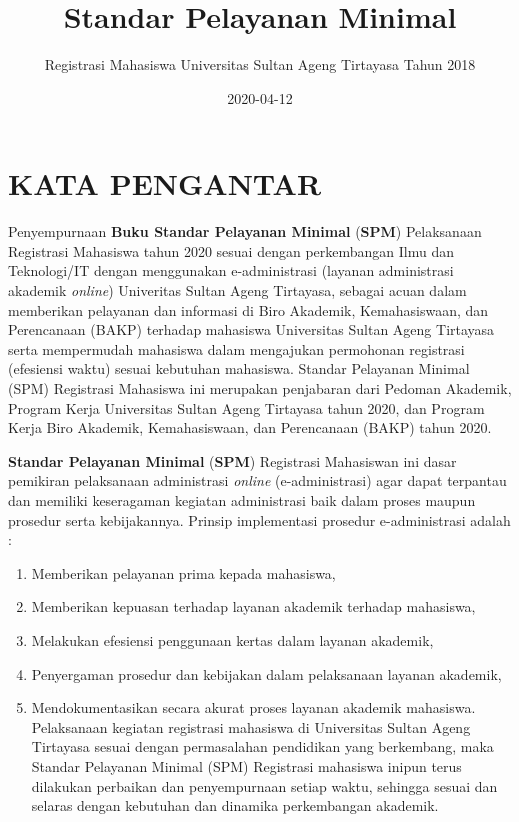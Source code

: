 \documentclass[
]{book}
\title{Standar Pelayanan Minimal}
\author{Registrasi Mahasiswa Universitas Sultan Ageng Tirtayasa Tahun 2018}
\date{2020-04-12}
\providecommand{\tightlist}{%
  \setlength{\itemsep}{0pt}\setlength{\parskip}{0pt}}
\begin{document}
\maketitle

{
\setcounter{tocdepth}{1}
\tableofcontents
}
\hypertarget{kata-pengantar}{%
\chapter*{KATA PENGANTAR}\label{kata-pengantar}}

Penyempurnaan \textbf{Buku Standar Pelayanan Minimal} (\textbf{SPM}) Pelaksanaan Registrasi Mahasiswa tahun 2020 sesuai dengan perkembangan Ilmu dan Teknologi/IT dengan menggunakan e-administrasi (layanan administrasi akademik \emph{online}) Univeritas Sultan Ageng Tirtayasa, sebagai acuan dalam memberikan pelayanan dan informasi di Biro Akademik, Kemahasiswaan, dan Perencanaan (BAKP) terhadap mahasiswa Universitas Sultan Ageng Tirtayasa serta mempermudah mahasiswa dalam mengajukan permohonan registrasi (efesiensi waktu) sesuai kebutuhan mahasiswa.
Standar Pelayanan Minimal (SPM) Registrasi Mahasiswa ini merupakan penjabaran dari Pedoman Akademik, Program Kerja Universitas Sultan Ageng Tirtayasa tahun 2020, dan Program Kerja Biro Akademik, Kemahasiswaan, dan Perencanaan (BAKP) tahun 2020.

\textbf{Standar Pelayanan Minimal} (\textbf{SPM}) Registrasi Mahasiswan ini dasar pemikiran pelaksanaan administrasi \emph{online} (e-administrasi) agar dapat terpantau dan memiliki keseragaman kegiatan administrasi baik dalam proses maupun prosedur serta kebijakannya. Prinsip implementasi prosedur e-administrasi adalah :

\begin{enumerate}
\def\labelenumi{\arabic{enumi}.}
\tightlist
\item
  Memberikan pelayanan prima kepada mahasiswa,
\item
  Memberikan kepuasan terhadap layanan akademik terhadap mahasiswa,
\item
  Melakukan efesiensi penggunaan kertas dalam layanan akademik,
\item
  Penyergaman prosedur dan kebijakan dalam pelaksanaan layanan akademik,
\item
  Mendokumentasikan secara akurat proses layanan akademik mahasiswa. Pelaksanaan kegiatan registrasi mahasiswa di Universitas Sultan Ageng Tirtayasa sesuai dengan permasalahan pendidikan yang berkembang, maka Standar Pelayanan Minimal (SPM) Registrasi mahasiswa inipun terus dilakukan perbaikan dan penyempurnaan setiap waktu, sehingga sesuai dan selaras dengan kebutuhan dan dinamika perkembangan akademik.
\end{enumerate}
\end{document}
